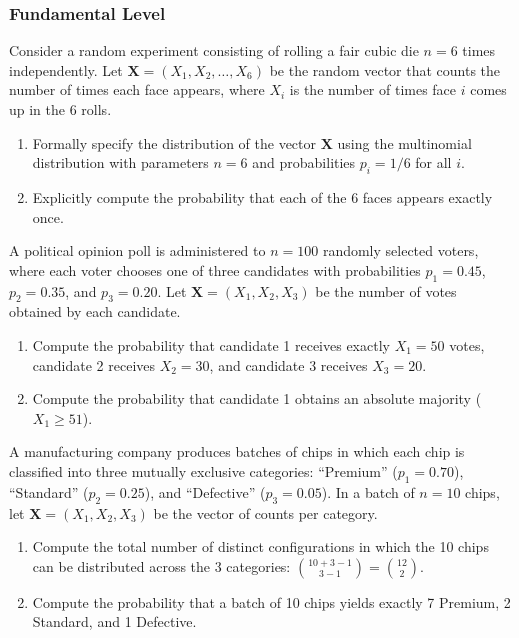 \subsubsection*{Fundamental Level}

\begin{problema}
	\label{prob:3.8.1}
	Consider a random experiment consisting of rolling a fair cubic die $n = 6$ times independently. Let $\bm{X} = (X_{1}, X_{2}, \dots, X_{6})$ be the random vector that counts the number of times each face appears, where $X_{i}$ is the number of times face $i$ comes up in the $6$ rolls.
	\begin{enumerate}
		\item Formally specify the distribution of the vector $\bm{X}$ using the multinomial distribution with parameters $n = 6$ and probabilities $p_{i} = 1/6$ for all $i$.
		\item Explicitly compute the probability that each of the 6 faces appears exactly once.
	\end{enumerate}
\end{problema}

\begin{problema}
	\label{prob:3.8.2}
	A political opinion poll is administered to $n = 100$ randomly selected voters, where each voter chooses one of three candidates with probabilities $p_{1} = 0.45$, $p_{2} = 0.35$, and $p_{3} = 0.20$. Let $\bm{X} = (X_{1}, X_{2}, X_{3})$ be the number of votes obtained by each candidate.
	\begin{enumerate}
		\item Compute the probability that candidate 1 receives exactly $X_{1} = 50$ votes, candidate 2 receives $X_{2} = 30$, and candidate 3 receives $X_{3} = 20$.
		\item Compute the probability that candidate 1 obtains an absolute majority ($X_{1} \ge 51$).
	\end{enumerate}
\end{problema}

\begin{problema}
	\label{prob:3.8.3}
	A manufacturing company produces batches of chips in which each chip is classified into three mutually exclusive categories: ``Premium'' ($p_{1} = 0.70$), ``Standard'' ($p_{2} = 0.25$), and ``Defective'' ($p_{3} = 0.05$). In a batch of $n = 10$ chips, let $\bm{X} = (X_{1}, X_{2}, X_{3})$ be the vector of counts per category.
	\begin{enumerate}
		\item Compute the total number of distinct configurations in which the 10 chips can be distributed across the 3 categories: $\binom{10 + 3 - 1}{3 - 1} = \binom{12}{2}$.
		\item Compute the probability that a batch of 10 chips yields exactly 7 Premium, 2 Standard, and 1 Defective.
	\end{enumerate}
\end{problema}

